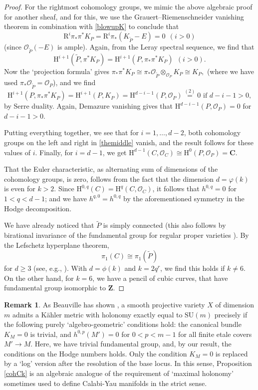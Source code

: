 \documentclass[12pt,reqno]{amsart}
\theoremstyle{definition}
\theoremstyle{plain}
\theoremstyle{definition}
\newtheorem{remark}[theorem]{Remark}
\newcommand{\Z}{\mathbf{Z}}
\newcommand{\Cc}{\mathbf{C}}
\renewcommand{\geq}{\geqslant}
\begin{document}
\begin{proof}
For the rightmost cohomology groups, we  mimic the above algebraic proof for another sheaf, and for this, we use the Grauert--Riemenschneider vanishing theorem \cite[Satz 2.3]{Grauert} in combination with \eqref{blowupK} to conclude that  $$\mathrm R^i \pi_* \pi^* K_P= \mathrm R^i \pi_* (K_{\widetilde P}-E) =0 \ \ (i>0)$$ (since $\mathcal O_{\widetilde P}(-E)$ is ample).  Again, from the Leray spectral sequence, we find that $$\mathrm H^{i+1}(\widetilde P, \pi^* K_P) = \mathrm H^{i+1}(P,\pi_* \pi^* K_P) \ \ (i>0).$$ Now the `projection formula' \cite[II.~Ex.~5.2(d)]{Hartshorne} gives $\pi_* \pi^* K_P \cong \pi_*\mathcal O_{\widetilde P} \otimes_{\mathcal O_P} K_P \cong K_P, $ (where we have used $ \pi_*\mathcal O_{\widetilde P} = \mathcal O_P$), and we find 
$$ \mathrm H^{i+1}(P,\pi_* \pi^* K_P) = \mathrm H^{i+1}(P,K_P) = \mathrm H^{d-i-1}(P,\mathcal O_P) \overset{(2)}{=} 0 \mbox{ if } d-i-1>0, $$
by Serre duality. Again, Demazure vanishing gives that $\mathrm H^{d-i-1}(P,\mathcal O_P) = 0$ for $d-i-1>0$. 

Putting everything together, we see that for $i=1,\dots,d-2$, both cohomology groups on the left and right in \eqref{themiddle} vanish, and the result follows for these values of $i$. Finally, for $i=d-1$, we get $\mathrm H^{d-1}(C,\mathcal O_C) \cong \mathrm H^0(P,\mathcal O_P) = \Cc$. 

That the Euler characteristic, as alternating sum of dimensions of the cohomology groups, is zero, follows from the fact that the dimension $d=\varphi(k)$ is even for $k>2$.  Since $\mathrm H^{0,q}(C) = \mathrm H^q(C,\mathcal O_C)$, it follows that $h^{0,q}=0$ for $1<q<d-1$; and we have $h^{q,0}=h^{0,q}$ by the aforementioned symmetry in the Hodge decomposition. 

We have already noticed that $\widetilde P$ is simply connected (this also follows by birational invariance of the fundamental group for regular proper varieties \cite[X, Cor.~3.4]{SGA1}). By the Lefschetz hyperplane theorem, $$\pi_1(C) \cong \pi_1(\widetilde P)$$ for $d \geq 3$ (see, e.g., \cite[Thm.\ 7.4]{Milnor}). With $d=\phi(k)$ and $k=2q^r$, we find this holds if $k \neq 6$. On the other hand, for $k=6$, we have a pencil of cubic curves, that have fundamental group isomorphic to $\Z$. 
\end{proof} 

\begin{remark} 
As Beauville has shown \cite[Prop.\ 2]{Beauville}, a smooth projective variety $X$ of dimension $m$ admits a K\"ahler metric with holonomy exactly equal to $\mathrm{SU}(m)$ precisely if the following purely `algebro-geometric' conditions hold: the canonical bundle $K_M=0$ is trivial, and $h^{0,p}(M')=0$ for $0<p<m-1$ for all finite etale covers $M' \rightarrow M$. Here, we have trivial fundamental group, and, by our result, the conditions on the Hodge numbers holds. Only the condition $K_M=0$ is replaced by a `log' version after the resolution of the base locus. In this sense, Proposition \ref{cohCk} is an algebraic analogue of the requirement of `maximal holonomy' sometimes used to define Calabi-Yau manifolds in the strict sense. 
\end{remark} 
\end{document}
